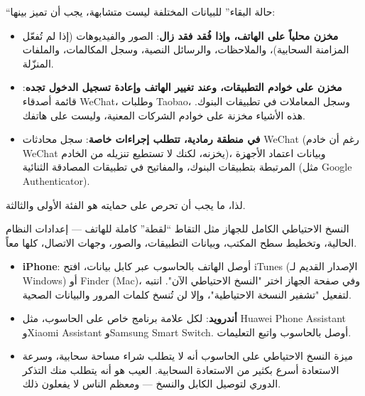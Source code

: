


“حالة البقاء” للبيانات المختلفة ليست متشابهة، يجب أن تميز بينها:

\begin{itemize}
  \item \textbf{مخزن محلياً على الهاتف، وإذا فُقد فقد زال}: الصور والفيديوهات (إذا لم تُفعّل المزامنة السحابية)، والملاحظات، والرسائل النصية، وسجل المكالمات، والملفات المنزّلة.
  \item \textbf{مخزن على خوادم التطبيقات، وعند تغيير الهاتف وإعادة تسجيل الدخول تجده}: قائمة أصدقاء WeChat، وطلبات Taobao، وسجل المعاملات في تطبيقات البنوك. هذه الأشياء مخزنة على خوادم الشركات المعنية، وليست على هاتفك.
  \item \textbf{في منطقة رمادية، تتطلب إجراءات خاصة}: سجل محادثات WeChat (رغم أن خادم WeChat يخزنه، لكنك لا تستطيع تنزيله من الخادم)، وبيانات اعتماد الأجهزة المرتبطة بتطبيقات البنوك، والمفاتيح في تطبيقات المصادقة الثنائية (مثل Google Authenticator).
\end{itemize}

لذا، ما يجب أن تحرص على حمايته هو الفئة الأولى والثالثة.


النسخ الاحتياطي الكامل للجهاز مثل التقاط “لقطة” كاملة للهاتف — إعدادات النظام الحالية، وتخطيط سطح المكتب، وبيانات التطبيقات، والصور، وجهات الاتصال، كلها معاً.


\begin{itemize}
  \item \textbf{iPhone}: أوصل الهاتف بالحاسوب عبر كابل بيانات، افتح iTunes (الإصدار القديم لـ Windows) أو Finder (Mac)، وفي صفحة الجهاز اختر "النسخ الاحتياطي الآن". انتبه لتفعيل "تشفير النسخة الاحتياطية"، وإلا لن تُنسخ كلمات المرور والبيانات الصحية.
  \item \textbf{أندرويد}: لكل علامة برنامج خاص على الحاسوب، مثل Huawei Phone Assistant وXiaomi Assistant وSamsung Smart Switch. أوصل بالحاسوب واتبع التعليمات.
  \item ميزة النسخ الاحتياطي على الحاسوب أنه لا يتطلب شراء مساحة سحابية، وسرعة الاستعادة أسرع بكثير من الاستعادة السحابية. العيب هو أنه يتطلب منك التذكر الدوري لتوصيل الكابل والنسخ — ومعظم الناس لا يفعلون ذلك.
\end{itemize}

